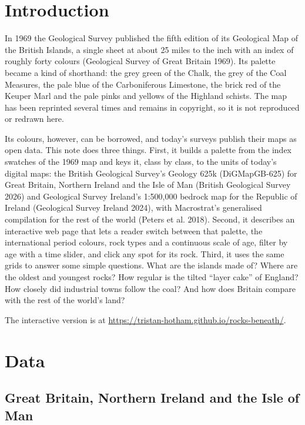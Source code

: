 \documentclass[11pt,a4paper]{article}
\begin{document}
\section{Introduction}

In 1969 the Geological Survey published the fifth edition of its Geological Map of the British Islands, a single sheet at about 25 miles to the inch with an index of roughly forty colours (Geological Survey of Great Britain 1969). Its palette became a kind of shorthand: the grey green of the Chalk, the grey of the Coal Measures, the pale blue of the Carboniferous Limestone, the brick red of the Keuper Marl and the pale pinks and yellows of the Highland schists. The map has been reprinted several times and remains in copyright, so it is not reproduced or redrawn here.

Its colours, however, can be borrowed, and today's surveys publish their maps as open data. This note does three things. First, it builds a palette from the index swatches of the 1969 map and keys it, class by class, to the units of today's digital maps: the British Geological Survey's Geology 625k (DiGMapGB-625) for Great Britain, Northern Ireland and the Isle of Man (British Geological Survey 2026) and Geological Survey Ireland's 1:500,000 bedrock map for the Republic of Ireland (Geological Survey Ireland 2024), with Macrostrat's generalised compilation for the rest of the world (Peters et al. 2018). Second, it describes an interactive web page that lets a reader switch between that palette, the international period colours, rock types and a continuous scale of age, filter by age with a time slider, and click any spot for its rock. Third, it uses the same grids to answer some simple questions. What are the islands made of? Where are the oldest and youngest rocks? How regular is the tilted ``layer cake'' of England? How closely did industrial towns follow the coal? And how does Britain compare with the rest of the world's land?

The interactive version is at \url{https://tristan-hotham.github.io/rocks-beneath/}.

\section{Data}

\subsection{Great Britain, Northern Ireland and the Isle of Man}
\end{document}
